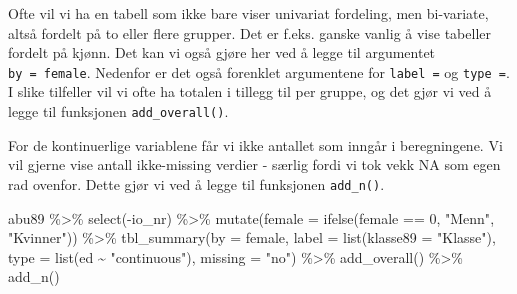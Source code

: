 \documentclass[
  norsk,
  letterpaper,
  DIV=11,
  numbers=noendperiod]{scrreprt}
\newenvironment{Shaded}{\begin{snugshade}}{\end{snugshade}}
\newcommand{\AttributeTok}[1]{\textcolor[rgb]{0.40,0.45,0.13}{#1}}
\newcommand{\DecValTok}[1]{\textcolor[rgb]{0.68,0.00,0.00}{#1}}
\newcommand{\FunctionTok}[1]{\textcolor[rgb]{0.28,0.35,0.67}{#1}}
\newcommand{\NormalTok}[1]{\textcolor[rgb]{0.00,0.23,0.31}{#1}}
\newcommand{\SpecialCharTok}[1]{\textcolor[rgb]{0.37,0.37,0.37}{#1}}
\newcommand{\StringTok}[1]{\textcolor[rgb]{0.13,0.47,0.30}{#1}}
\theoremstyle{definition}
\theoremstyle{remark}
\begin{document}
Ofte vil vi ha en tabell som ikke bare viser univariat fordeling, men
bi-variate, altså fordelt på to eller flere grupper. Det er f.eks.
ganske vanlig å vise tabeller fordelt på kjønn. Det kan vi også gjøre
her ved å legge til argumentet \texttt{by\ =\ female}. Nedenfor er det
også forenklet argumentene for \texttt{label\ =} og \texttt{type\ =}. I
slike tilfeller vil vi ofte ha totalen i tillegg til per gruppe, og det
gjør vi ved å legge til funksjonen \texttt{add\_overall()}.

For de kontinuerlige variablene får vi ikke antallet som inngår i
beregningene. Vi vil gjerne vise antall ikke-missing verdier - særlig
fordi vi tok vekk NA som egen rad ovenfor. Dette gjør vi ved å legge til
funksjonen \texttt{add\_n()}.

\begin{Shaded}
\begin{Highlighting}[]
\NormalTok{abu89 }\SpecialCharTok{\%\textgreater{}\%} 
  \FunctionTok{select}\NormalTok{(}\SpecialCharTok{{-}}\NormalTok{io\_nr) }\SpecialCharTok{\%\textgreater{}\%} 
  \FunctionTok{mutate}\NormalTok{(}\AttributeTok{female =} \FunctionTok{ifelse}\NormalTok{(female }\SpecialCharTok{==} \DecValTok{0}\NormalTok{, }\StringTok{"Menn"}\NormalTok{, }\StringTok{"Kvinner"}\NormalTok{)) }\SpecialCharTok{\%\textgreater{}\%} 
    \FunctionTok{tbl\_summary}\NormalTok{(}\AttributeTok{by =}\NormalTok{ female, }
                \AttributeTok{label =} \FunctionTok{list}\NormalTok{(}\AttributeTok{klasse89 =} \StringTok{"Klasse"}\NormalTok{), }
              \AttributeTok{type =} \FunctionTok{list}\NormalTok{(ed }\SpecialCharTok{\textasciitilde{}} \StringTok{"continuous"}\NormalTok{), }
              \AttributeTok{missing =} \StringTok{"no"}\NormalTok{) }\SpecialCharTok{\%\textgreater{}\%} 
  \FunctionTok{add\_overall}\NormalTok{() }\SpecialCharTok{\%\textgreater{}\%} 
  \FunctionTok{add\_n}\NormalTok{()}
\end{Highlighting}
\end{Shaded}
\end{document}
